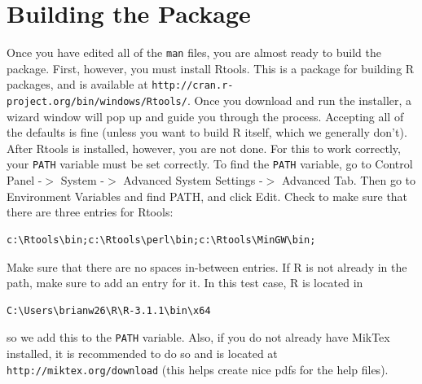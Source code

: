 \documentclass{article}
\begin{document}
\section{Building the Package}
Once you have edited all of the \texttt{man} files, you are almost ready to build the package. First, however, you must install Rtools. This is a package for building R packages, and is available at \texttt{http://cran.r-project.org/bin/windows/Rtools/}. Once you download and run the installer, a wizard window will pop up and guide you through the process. Accepting all of the defaults is fine (unless you want to build R itself, which we generally don't). After Rtools is installed, however, you are not done. For this to work correctly, your \texttt{PATH} variable must be set correctly. To find the \texttt{PATH} variable, go to Control Panel -$>$ System -$>$ Advanced System Settings -$>$ Advanced Tab. Then go to Environment Variables and find PATH, and click Edit. Check to make sure that there are three entries for Rtools: \begin{verbatim}c:\Rtools\bin;c:\Rtools\perl\bin;c:\Rtools\MinGW\bin;\end{verbatim} Make sure that there are no spaces in-between entries. If R is not already in the path, make sure to add an entry for it. In this test case, R is located in \begin{verbatim}
C:\Users\brianw26\R\R-3.1.1\bin\x64
\end{verbatim}
so we add this to the \texttt{PATH} variable. Also, if you do not already have MikTex installed, it is recommended to do so and is located at \texttt{http://miktex.org/download} (this helps create nice pdfs for the help files). 
\end{document}
